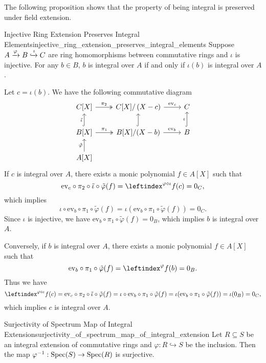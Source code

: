 The following proposition shows that the property of being integral is preserved under field extension.
\begin{proposition}{Injective Ring Extension Preserves Integral Elements}{injective_ring_extension_preserves_integral_elements}
    Suppose $A\xrightarrow{\varphi} B\xhookrightarrow{\iota} C$ are ring homomorphisms between commutative rings and $\iota$ is injective. For any $b\in B$, $b$ is integral over $A$ if and only if $\iota(b)$ is integral over $A$.
\end{proposition}
\begin{prf}
   Let $c=\iota(b)$. We have the following commutative diagram
    \[
        \begin{tikzcd}
            {C[X]} \arrow[r, "\pi_2", two heads]                                  & {C[X]/\left(X-c\right)} \arrow[r, "\mathrm{ev}_c"]      & C                          \\
            {B[X]} \arrow[u, "\tilde{\iota}", hook] \arrow[r, "\pi_1", two heads] & {B[X]/(X-b)} \arrow[r, "\mathrm{ev}_b"] \arrow[u, hook] & B \arrow[u, "\iota", hook] \\
            {A[X]} \arrow[u, "\tilde{\varphi}"]                                   &                                                         &                           
            \end{tikzcd}
    \]
    If $c$ is integral over $A$, there exists a monic polynomial $f\in A[X]$ such that 
    \[
    \mathrm{ev}_c\circ\pi_2\circ\tilde{\iota}\circ\tilde{\varphi}(f)=\leftindex^{\varphi\circ\iota}f(c)=0_C,
    \]
    which implies 
    \[
        \iota\circ\mathrm{ev}_b\circ \pi_1\circ\tilde{\varphi}(f)=\iota(\mathrm{ev}_b\circ \pi_1\circ\tilde{\varphi}(f))=0_C.
    \]
    Since $\iota$ is injective, we have $\mathrm{ev}_b\circ \pi_1\circ\tilde{\varphi}(f)=0_B$, which implies $b$ is integral over $A$.

    Conversely, if $b$ is integral over $A$, there exists a monic polynomial $f\in A[X]$ such that
    \[
        \mathrm{ev}_b\circ \pi_1\circ\tilde{\varphi}(f)=\leftindex^{\varphi}f(b)=0_B.
    \]
    Thus we have
    \[
        \leftindex^{\varphi\circ\iota}f(c)=\mathrm{ev}_c\circ\pi_2\circ\tilde{\iota}\circ\tilde{\varphi}(f)=\iota\circ\mathrm{ev}_b\circ \pi_1\circ\tilde{\varphi}(f)=\iota(\mathrm{ev}_b\circ \pi_1\circ\tilde{\varphi}(f))=\iota(0_B)=0_C,
    \]
    which implies $c$ is integral over $A$.
\end{prf}


\begin{proposition}{Surjectivity of Spectrum Map of Integral Extension}{surjectivity_of_spectrum_map_of_integral_extension}
    Let $R\subseteq S$ be an integral extension of commutative rings and $\varphi:R\hookrightarrow S$ be the inclusion. Then the map $\varphi^{-1}:\operatorname{Spec} (S)\to \operatorname{Spec} (R)$ is surjective.
\end{proposition}


